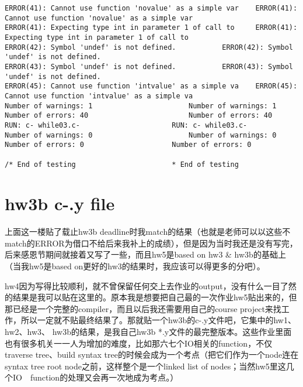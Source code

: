 \documentclass[12pt]{book}
\begin{document}
\begin{lstlisting}
ERROR(41): Cannot use function 'novalue' as a simple var	ERROR(41): Cannot use function 'novalue' as a simple var
ERROR(41): Expecting type int in parameter 1 of call to 	ERROR(41): Expecting type int in parameter 1 of call to 
ERROR(42): Symbol 'undef' is not defined.			ERROR(42): Symbol 'undef' is not defined.
ERROR(43): Symbol 'undef' is not defined.			ERROR(43): Symbol 'undef' is not defined.
ERROR(45): Cannot use function 'intvalue' as a simple va	ERROR(45): Cannot use function 'intvalue' as a simple va
Number of warnings: 1						Number of warnings: 1
Number of errors: 40						Number of errors: 40
RUN: c- while03.c-						RUN: c- while03.c-
Number of warnings: 0						Number of warnings: 0
Number of errors: 0						Number of errors: 0

/* End of testing						* End of testing
\end{lstlisting}

\chapter{hw3b c-.y file}
\label{sec-9}

上面这一楼贴了载止hw3b deadline时我match的结果（也就是老师可以以这些不match的ERROR为借口不给后来我补上的成绩），但是因为当时我还是没有写完，后来感恩节期间就接着又写了一些，而且hw5是based on hw3 \& hw3b的基础上（当我hw5是based on更好的hw3的结果时，我应该可以得更多的分吧）。

hw4因为写得比较顺利，就不曾保留任何交上去作业的output，没有什么一目了然的结果是我可以贴在这里的。原本我是想要把自己最的一次作业hw5贴出来的，但那已经是一个完整的compiler，而且以后我还需要用自己的course project来找工作，所以一定就不贴最终结果了。那就贴一个hw3b的c-.y文件吧，它集中的hw1、hw2、hw3、 hw3b的结果，是我自己hw3b *.y文件的最完整版本。这些作业里面也有很多机关一一人为增加的难度，比如那六七个IO相关的function，不仅traverse tree、build syntax tree的时候会成为一个考点（把它们作为一个node连在syntax tree root node之前，这样整个是一个linked list of nodes；当然hw5里这几个IO　function的处理又会再一次地成为考点。）
\end{document}
